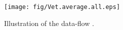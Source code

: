 
\begin{figure}[!ht]
\begin{center}
\texttt{[image: fig/Vet.average.all.eps]}
\caption{Illustration of the data-flow \IG.}\label{fig:average}
\end{center}
\end{figure}
